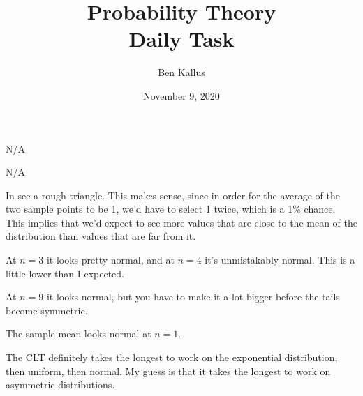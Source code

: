 \documentclass[12pt]{article}
\title{Probability Theory \\ Daily Task}
\author{Ben Kallus}
\date{November 9, 2020}
\begin{document}
\color{white}
\pagecolor{black}
\maketitle

 N/A

\medskip
{} N/A

\medskip
{} In see a rough triangle. This makes sense, since in order for the average of the two sample points to be 1, we'd have to select 1 twice, which is a 1\% chance. This implies that we'd expect to see more values that are close to the mean of the distribution than values that are far from it.

\medskip
{} At $n=3$ it looks pretty normal, and at $n=4$ it's unmistakably normal. This is a little lower than I expected.

\medskip
{} At $n=9$ it looks normal, but you have to make it a lot bigger before the tails become symmetric. 

\medskip
{} The sample mean looks normal at $n=1$.

\medskip
{} The CLT definitely takes the longest to work on the exponential distribution, then uniform, then normal. My guess is that it takes the longest to work on asymmetric distributions.
\end{document}
